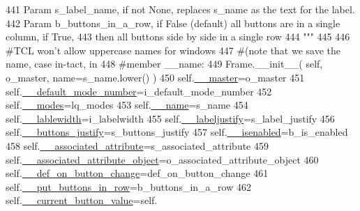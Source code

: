 \begin{DoxyCode}
441 \textcolor{stringliteral}{        Param s\_label\_name, if not None, replaces s\_name as the text for the label.}
442 \textcolor{stringliteral}{        Param b\_buttons\_in\_a\_row, if False (default) all buttons are in a single column, if True,}
443 \textcolor{stringliteral}{                then all buttons side by side in a single row}
444 \textcolor{stringliteral}{        """}
445 
446         \textcolor{comment}{#TCL won't allow uppercase names for windows}
447         \textcolor{comment}{#(note that we save the name, case in-tact, in}
448         \textcolor{comment}{#member \_\_name:}
449         Frame.\_\_init\_\_( self, o\_master, name=s\_name.lower() )
450         self.\hyperlink{classnegui_1_1pgguiutilities_1_1KeyCategoricalValueFrame_ad0cd6c8b8265cb6b27efa7bbc5e23ae0}{\_\_master}=o\_master
451         self.\hyperlink{classnegui_1_1pgguiutilities_1_1KeyCategoricalValueFrame_ae5f2855d8f22b4aa8f533023ac3e7fb4}{\_\_default\_mode\_number}=i\_default\_mode\_number
452         self.\hyperlink{classnegui_1_1pgguiutilities_1_1KeyCategoricalValueFrame_aadb3b6381c9159d303cd150e5a748096}{\_\_modes}=lq\_modes
453         self.\hyperlink{classnegui_1_1pgguiutilities_1_1KeyCategoricalValueFrame_a92a1947d6110ada3bd813cc8e84d84ad}{\_\_name}=s\_name
454         self.\hyperlink{classnegui_1_1pgguiutilities_1_1KeyCategoricalValueFrame_adf2c2370358ac051464aef108d75caa3}{\_\_lablewidth}=i\_labelwidth
455         self.\hyperlink{classnegui_1_1pgguiutilities_1_1KeyCategoricalValueFrame_a96cbcef967bddfd5035b827c0ae50c05}{\_\_labeljustify}=s\_label\_justify
456         self.\hyperlink{classnegui_1_1pgguiutilities_1_1KeyCategoricalValueFrame_a1fa18274aa53997c8b5fe446779b9a9d}{\_\_buttons\_justify}=s\_buttons\_justify
457         self.\hyperlink{classnegui_1_1pgguiutilities_1_1KeyCategoricalValueFrame_afb2be50b6de2bac5c96b9d73d93da416}{\_\_isenabled}=b\_is\_enabled
458         self.\hyperlink{classnegui_1_1pgguiutilities_1_1KeyCategoricalValueFrame_aa9b8f1b85890b51192559ff142d2360f}{\_\_associated\_attribute}=s\_associated\_attribute
459         self.\hyperlink{classnegui_1_1pgguiutilities_1_1KeyCategoricalValueFrame_a14174765fdf3479d1f7f09fe1deda5cf}{\_\_associated\_attribute\_object}=o\_associated\_attribute\_object
460         self.\hyperlink{classnegui_1_1pgguiutilities_1_1KeyCategoricalValueFrame_a0e462eacf72e4afb9711c917fe1c0d6a}{\_\_def\_on\_button\_change}=def\_on\_button\_change
461         self.\hyperlink{classnegui_1_1pgguiutilities_1_1KeyCategoricalValueFrame_a869087c9cc908de0226eec78cb4282bb}{\_\_put\_buttons\_in\_row}=b\_buttons\_in\_a\_row
462         self.\hyperlink{classnegui_1_1pgguiutilities_1_1KeyCategoricalValueFrame_aa1bb987386f2e559c6de976b745f185e}{\_\_current\_button\_value}=self.

\end{DoxyCode}
